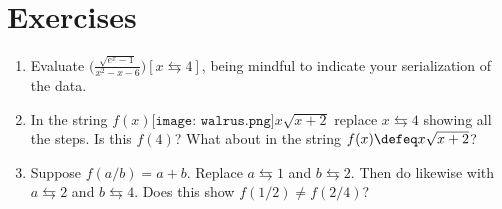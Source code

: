 
\section*{Exercises}
\begin{enumerate}
    \item Evaluate $\biggl(\frac{\sqrt{e^x-1}}{x^2-x-6}\biggr)[x\leftrightarrows 4]$, being mindful to 
    indicate your serialization of the data.
    \item In the string \(f(x)\texttt{[image: walrus.png]} x\sqrt{x+2}\) 
    replace $x\leftrightarrows 4$ showing all the steps.  Is this $f(4)$? 
    What about in the string \(f(x)\defeq x\sqrt{x+2}\)?
\item Suppose $f(a/b)=a+b$.  Replace $a\leftrightarrows 1$ and $b\leftrightarrows 2$.  
Then do likewise with $a\leftrightarrows 2$ and $b\leftrightarrows 4$.  Does this show 
$f(1/2)\neq f(2/4)$?  

\end{enumerate}
